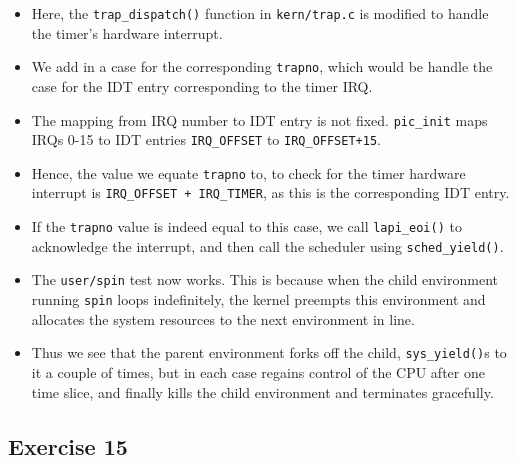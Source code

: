 \documentclass[]{article}
\begin{document}
\begin{itemize}
\itemsep1pt\parskip0pt
\item
  Here, the \texttt{trap\_dispatch()} function in \texttt{kern/trap.c}
  is modified to handle the timer's hardware interrupt.
\item
  We add in a case for the corresponding \texttt{trapno}, which would be
  handle the case for the IDT entry corresponding to the timer IRQ.
\item
  The mapping from IRQ number to IDT entry is not fixed.
  \texttt{pic\_init} maps IRQs 0-15 to IDT entries \texttt{IRQ\_OFFSET}
  to \texttt{IRQ\_OFFSET+15}.
\item
  Hence, the value we equate \texttt{trapno} to, to check for the timer
  hardware interrupt is \texttt{IRQ\_OFFSET + IRQ\_TIMER}, as this is
  the corresponding IDT entry.
\item
  If the \texttt{trapno} value is indeed equal to this case, we call
  \texttt{lapi\_eoi()} to acknowledge the interrupt, and then call the
  scheduler using \texttt{sched\_yield()}.
\item
  The \texttt{user/spin} test now works. This is because when the child
  environment running \texttt{spin} loops indefinitely, the kernel
  preempts this environment and allocates the system resources to the
  next environment in line.
\item
  Thus we see that the parent environment forks off the child,
  \texttt{sys\_yield()}s to it a couple of times, but in each case
  regains control of the CPU after one time slice, and finally kills the
  child environment and terminates gracefully.
\end{itemize}

\subsection{Exercise 15}
\end{document}
